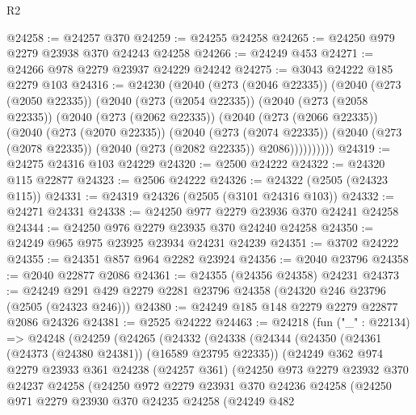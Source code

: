 \begin{lexlean}{R2}
\begin{coremodule}
@24258 := @24257 @370
@24259 := @24255 @24258
@24265 := @24250 @979 @2279 @23938 @370 @24243 @24258
@24266 := @24249 @453
@24271 := @24266 @978 @2279 @23937 @24229 @24242
@24275 := @3043 @24222 @185 @2279 @103
@24316 := @24230
    (@2040
      (@273 (@2046 @22335))
      (@2040
        (@273 (@2050 @22335))
        (@2040
          (@273 (@2054 @22335))
          (@2040
            (@273 (@2058 @22335))
            (@2040
              (@273 (@2062 @22335))
              (@2040
                (@273 (@2066 @22335))
                (@2040
                  (@273 (@2070 @22335))
                  (@2040
                    (@273 (@2074 @22335))
                    (@2040 (@273 (@2078 @22335)) (@2040 (@273 (@2082 @22335)) @2086))))))))))
@24319 := @24275 @24316 @103 @24229
@24320 := @2500 @24222
@24322 := @24320 @115 @22877
@24323 := @2506 @24222
@24326 := @24322 (@2505 (@24323 @115))
@24331 := @24319 @24326 (@2505 (@3101 @24316 @103))
@24332 := @24271 @24331
@24338 := @24250 @977 @2279 @23936 @370 @24241 @24258
@24344 := @24250 @976 @2279 @23935 @370 @24240 @24258
@24350 := @24249 @965 @975 @23925 @23934 @24231 @24239
@24351 := @3702 @24222
@24355 := @24351 @857 @964 @2282 @23924
@24356 := @2040 @23796
@24358 := @2040 @22877 @2086
@24361 := @24355 (@24356 @24358) @24231
@24373 := @24249 @291 @429 @2279 @2281 @23796 @24358 (@24320 @246 @23796 (@2505 (@24323 @246)))
@24380 := @24249 @185 @148 @2279 @2279 @22877 @2086 @24326
@24381 := @2525 @24222
@24463 := @24218
    (fun ("_" : @22134) =>
    @24248
      (@24259
        (@24265
          (@24332
            (@24338
              (@24344
                (@24350
                  (@24361 (@24373 (@24380 @24381)) (@16589 @23795 @22335))
                  (@24249
                    @362
                    @974
                    @2279
                    @23933
                    @361
                    @24238
                    (@24257 @361)
                    (@24250
                      @973
                      @2279
                      @23932
                      @370
                      @24237
                      @24258
                      (@24250
                        @972
                        @2279
                        @23931
                        @370
                        @24236
                        @24258
                        (@24250
                          @971
                          @2279
                          @23930
                          @370
                          @24235
                          @24258
                          (@24249
                            @482

\end{coremodule}
\end{lexlean}
